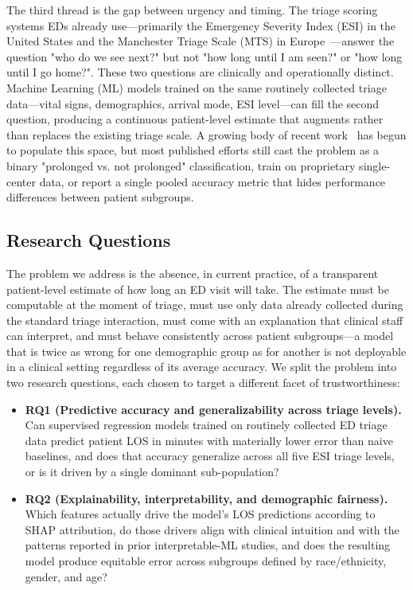 \documentclass[conference]{IEEEtran}
\begin{document}
The third thread is the gap between urgency and timing. The triage scoring
systems EDs already use---primarily the Emergency Severity
Index (ESI) in the United States and the Manchester Triage Scale (MTS) in
Europe~\cite{gilboy2012}---answer the question "who do we see next?" but not
"how long until I am seen?" or "how long until I go home?". These two
questions are clinically and operationally distinct. Machine Learning (ML)
models trained on the same routinely collected triage data---vital signs,
demographics, arrival mode, ESI level---can fill the second question,
producing a continuous patient-level estimate that augments rather than
replaces the existing triage scale. A growing body of recent
work~\cite{wang2025fair, wu2025, wang2025interp} has begun to populate this
space, but most published efforts still cast the problem as a binary
"prolonged vs. not prolonged" classification, train on proprietary
single-center data, or report a single pooled accuracy metric that hides
performance differences between patient subgroups.

\subsection{Research Questions}
The problem we address is the absence, in current practice, of a transparent
patient-level estimate of how long an ED visit will take. The estimate must be
computable at the moment of triage, must use only data already collected
during the standard triage interaction, must come with an explanation that
clinical staff can interpret, and must behave consistently across patient
subgroups---a model that is twice as wrong for one demographic group as for
another is not deployable in a clinical setting regardless of its average
accuracy. We split the problem into two research questions, each chosen to
target a different facet of trustworthiness:

\begin{itemize}
    \item \textbf{RQ1 (Predictive accuracy and generalizability across triage
    levels).} Can supervised regression models trained on routinely collected
    ED triage data predict patient LOS in minutes with materially lower error
    than naive baselines, and does that accuracy generalize across all five
    ESI triage levels, or is it driven by a single dominant sub-population?
    \item \textbf{RQ2 (Explainability, interpretability, and demographic
    fairness).} Which features actually drive the model's LOS predictions
    according to SHAP attribution, do those drivers align with clinical
    intuition and with the patterns reported in prior interpretable-ML
    studies, and does the resulting model produce equitable error across
    subgroups defined by race/ethnicity, gender, and age?
\end{itemize}
\end{document}
